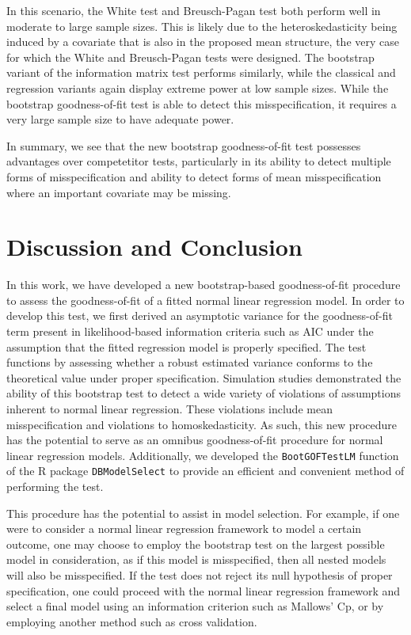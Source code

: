 \documentclass[submit]{smj}
\begin{document}
In this scenario, the White test and Breusch-Pagan test both perform well in moderate to large sample sizes. This is likely due to the heteroskedasticity being induced by a covariate that is also in the 
proposed mean structure, the very case for which the White and Breusch-Pagan tests were designed. The bootstrap variant of the information matrix test performs similarly, while the classical and regression
variants again display extreme power at low sample sizes. While the bootstrap goodness-of-fit test is able to detect this misspecification, it requires a very large sample size to have adequate power.

In summary, we see that the new bootstrap goodness-of-fit test possesses advantages over competetitor tests, particularly in its ability to detect multiple forms of misspecification and ability to detect
forms of mean misspecification where an important covariate may be missing.

\section{Discussion and Conclusion}

In this work, we have developed a new bootstrap-based goodness-of-fit procedure to assess the goodness-of-fit of a fitted normal linear regression model. In order
to develop this test, we first derived an asymptotic variance for the goodness-of-fit term present in likelihood-based information criteria such as AIC under the assumption
that the fitted regression model is properly specified. The test functions by assessing whether a robust estimated variance conforms to the
theoretical value under proper specification. Simulation studies demonstrated the ability of this bootstrap test to detect a wide variety of violations of assumptions inherent to
normal linear regression. These violations include mean misspecification and violations to homoskedasticity. As such, this new procedure has the potential to serve as an omnibus
goodness-of-fit procedure for normal linear regression models. Additionally, we developed the \verb|BootGOFTestLM| function of the R package \verb|DBModelSelect| to provide
an efficient and convenient method of performing the test.

This procedure has the potential to assist in model selection. For example, if one were to consider a normal linear regression framework to model a certain outcome, one may
choose to employ the bootstrap test on the largest possible model in consideration, as if this model is misspecified, then all nested models will also be misspecified.
If the test does not reject its null hypothesis of proper specification, one could proceed with the normal linear regression framework and select a final model using
an information criterion such as Mallows' Cp, or by employing another method such as cross validation.
\end{document}
